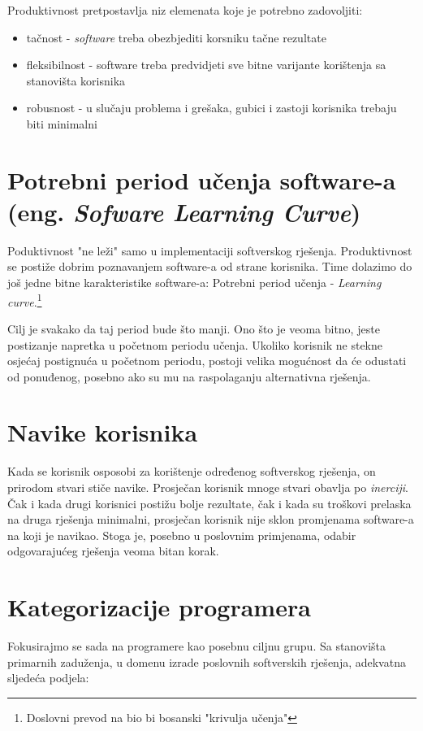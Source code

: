 \documentclass[times, utf8, seminar]{fit}
\begin{document}
Produktivnost pretpostavlja niz elemenata koje je potrebno zadovoljiti:
\begin{itemize}
  \item tačnost - \emph{software} treba obezbjediti korsniku tačne rezultate
  \item fleksibilnost - software treba predvidjeti sve bitne varijante korištenja sa stanovišta korisnika
  \item robusnost - u slučaju problema i grešaka, gubici i zastoji korisnika trebaju biti minimalni
\end{itemize}

\section{Potrebni period učenja software-a (eng. \emph{Sofware Learning Curve})}

Poduktivnost "ne leži" samo u implementaciji softverskog rješenja. Produktivnost se postiže dobrim poznavanjem software-a od strane korisnika. Time dolazimo do još jedne bitne karakteristike software-a: Potrebni period učenja - \emph{Learning curve}.\footnote{Doslovni prevod na bio bi bosanski "krivulja učenja"}

Cilj je svakako da taj period bude što manji. Ono što je veoma bitno, jeste postizanje napretka u početnom periodu učenja. Ukoliko korisnik ne stekne osjećaj postignuća u početnom periodu, postoji velika mogućnost da će odustati od ponuđenog, posebno ako su mu na raspolaganju alternativna rješenja.

\section{Navike korisnika}

Kada se korisnik osposobi za korištenje određenog softverskog rješenja, on prirodom stvari stiče navike. Prosječan korisnik mnoge stvari obavlja po \emph{inerciji}. Čak i kada drugi korisnici postižu bolje rezultate, čak i kada su troškovi prelaska na druga rješenja minimalni, prosječan korisnik nije sklon promjenama software-a na koji je navikao. Stoga je, posebno u poslovnim primjenama, odabir odgovarajućeg rješenja veoma bitan korak.

\section{Kategorizacije programera}

Fokusirajmo se sada na programere kao posebnu ciljnu grupu. Sa stanovišta primarnih zaduženja, u domenu izrade poslovnih softverskih rješenja, adekvatna sljedeća podjela:
\end{document}
